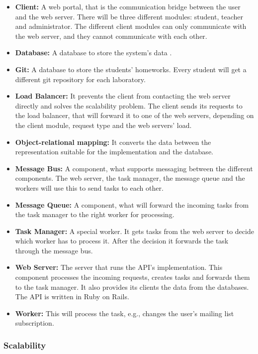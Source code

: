 \begin{itemize}
	\item \textbf{Client:} A web portal, that is the communication bridge between the user and the web server. There will be three different modules: student, teacher and administrator. The different client modules can only communicate with the web server, and they cannot communicate with each other.
	\item \textbf{Database:} A database to store the system's data . 
	\item \textbf{Git:} A database to store the students' homeworks. Every student will get a different git repository for each laboratory.
	\item \textbf{Load Balancer:} It prevents the client from contacting the web server directly and solves the scalability problem. The client sends its requests to the load balancer, that will forward it to one of the web servers, depending on the client module, request type and the web servers' load.
	\item \textbf{Object-relational mapping:} It converts the data between the representation suitable for the implementation and the database. 
	\item \textbf{Message Bus:} A component, what supports messaging between the different components. The web server, the task manager, the message queue and the workers will use this to send tasks to each other.
	\item \textbf{Message Queue:} A component, what will forward the incoming tasks from the task manager to the right worker for processing. 
	\item \textbf{Task Manager:} A special worker. It gets tasks from the web server to decide which worker has to process it. After the decision it forwards the task through the message bus.
	\item \textbf{Web Server:} The server that runs the API's implementation. This component processes the incoming requests, creates tasks and forwards them to the task manager. It also provides its clients the data from the databases. The API is written in Ruby on Rails. 
	\item \textbf{Worker:} This will process the task, e.g., changes the user's mailing list subscription.
\end{itemize}

\subsubsection{Scalability}

